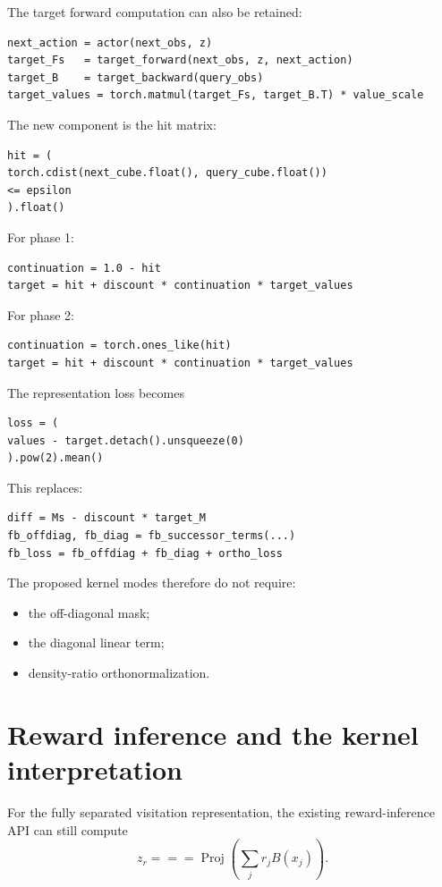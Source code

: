 \documentclass[10pt]{article}
\begin{document}
The target forward computation can also be retained:
\begin{verbatim}
next_action = actor(next_obs, z)
target_Fs   = target_forward(next_obs, z, next_action)
target_B    = target_backward(query_obs)
target_values = torch.matmul(target_Fs, target_B.T) * value_scale
\end{verbatim}

The new component is the hit matrix:
\begin{verbatim}
hit = (
torch.cdist(next_cube.float(), query_cube.float())
<= epsilon
).float()
\end{verbatim}

For phase 1:
\begin{verbatim}
continuation = 1.0 - hit
target = hit + discount * continuation * target_values
\end{verbatim}

For phase 2:
\begin{verbatim}
continuation = torch.ones_like(hit)
target = hit + discount * continuation * target_values
\end{verbatim}

The representation loss becomes
\begin{verbatim}
loss = (
values - target.detach().unsqueeze(0)
).pow(2).mean()
\end{verbatim}

This replaces:
\begin{verbatim}
diff = Ms - discount * target_M
fb_offdiag, fb_diag = fb_successor_terms(...)
fb_loss = fb_offdiag + fb_diag + ortho_loss
\end{verbatim}

The proposed kernel modes therefore do not require:
\begin{itemize}
\item the off-diagonal mask;
\item the diagonal linear term;
\item density-ratio orthonormalization.
\end{itemize}

\section{Reward inference and the kernel interpretation}

For the fully separated visitation representation, the existing reward-inference API can
still compute
\begin{equation}
z_r
===

\operatorname{Proj}
\left(
\sum_j r_jB(x_j)
\right).
\end{equation}
\end{document}
